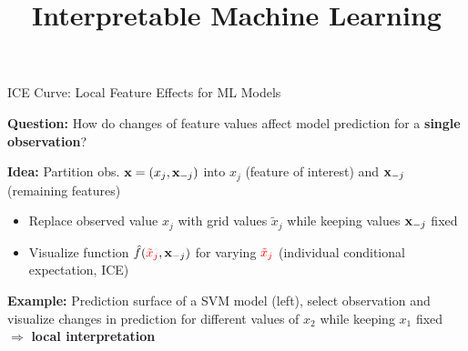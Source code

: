 \documentclass[11pt,compress,t,notes=noshow, aspectratio=169, xcolor=table,dvipsnames]{beamer}
\title{Interpretable Machine Learning}
\date{}
\begin{document}
\newcommand{\titlefigure}{figure/ale_plot.pdf}
\newcommand{\learninggoals}{
\item Difference between feature effects and feature interactions
\item REPID
\item GADGET
}


\begin{frame}{ICE Curve: Local Feature Effects for ML Models}

\textbf{Question:} How do changes of feature values affect model prediction for a \textbf{single observation}?



\textbf{Idea:} Partition obs. $\xv = (x_j, \xv_{-j})$ into $x_j$ (feature of interest) and $\xv_{-j}$ (remaining features) 
\begin{itemize}
    \item Replace observed value $x_j$ with {\color{red} grid values $\tilde x_j$} while keeping values $\xv_{-j}$ fixed
    \item Visualize function $\fh({\color{red}\tilde x_j}, \xv_{-j})$ for varying ${\color{red}\tilde x_j}$ (individual conditional expectation, ICE)%
\end{itemize}

\pause

\textbf{Example:} Prediction surface of a SVM model (left), select observation and visualize changes in prediction for different values of $x_2$ while keeping $x_1$ fixed $\Rightarrow$ \textbf{local interpretation}


\end{frame}
\end{document}
